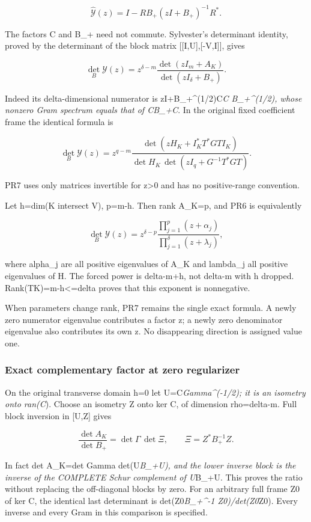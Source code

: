 \documentclass[11pt]{article}
\begin{document}
\[
\widehat{\mathscr Y}(z)
=I-RB_+(zI+B_+)^{-1}R^*.
\tag{PR5}
\]

The factors C and B\_+ need not commute. Sylvester's determinant identity, proved by the determinant of the block matrix {[}{[}I,U{]},{[}-V,I{]}{]}, gives

\[
\boxed{
\det_B\mathscr Y(z)
=z^{\delta-m}\frac{\det(zI_m+A_K)}{\det(zI_\delta+B_+)}.
}
\tag{PR6}
\]

Indeed its delta-dimensional numerator is zI+B\_+\^{}(1/2)C\emph{C B\_+\^{}(1/2), whose nonzero Gram spectrum equals that of CB\_+C}. In the original fixed coefficient frame the identical formula is

\[
\boxed{
\det_B\mathscr Y(z)
=z^{q-m}\frac{\det(zH_K+I_K^*T^*GTI_K)}
{\det H_K\,\det(zI_q+G^{-1}T^*GT)}.
}
\tag{PR7}
\]

PR7 uses only matrices invertible for z\textgreater0 and has no positive-range convention.

Let h=dim(K intersect V), p=m-h. Then rank A\_K=p, and PR6 is equivalently

\[
\det_B\mathscr Y(z)
=z^{\delta-p}
\frac{\prod_{j=1}^{p}(z+\alpha_j)}
{\prod_{j=1}^{\delta}(z+\lambda_j)},
\tag{PR8}
\]

where alpha\_j are all positive eigenvalues of A\_K and lambda\_j all positive eigenvalues of H. The forced power is delta-m+h, not delta-m with h dropped. Rank(T\textbar K)=m-h\textless=delta proves that this exponent is nonnegative.

When parameters change rank, PR7 remains the single exact formula. A newly zero numerator eigenvalue contributes a factor z; a newly zero denominator eigenvalue also contributes its own z. No disappearing direction is assigned value one.

\subsubsection{Exact complementary factor at zero regularizer}\label{exact-complementary-factor-at-zero-regularizer}

On the original transverse domain h=0 let U=C\emph{Gamma\^{}(-1/2); it is an isometry onto ran(C}). Choose an isometry Z onto ker C, of dimension rho=delta-m. Full block inversion in {[}U,Z{]} gives

\[
\boxed{
\frac{\det A_K}{\det B_+}
=\det\Gamma\,\det\Xi,\qquad
\Xi=Z^*B_+^{-1}Z.
}
\tag{PR8a}
\]

In fact det A\_K=det Gamma det(U\emph{B\_+U), and the lower inverse block is the inverse of the COMPLETE Schur complement of U}B\_+U. This proves the ratio without replacing the off-diagonal blocks by zero. For an arbitrary full frame Z0 of ker C, the identical last determinant is det(Z0\emph{B\_+\^{}-1 Z0)/det(Z0}Z0). Every inverse and every Gram in this comparison is specified.
\end{document}
